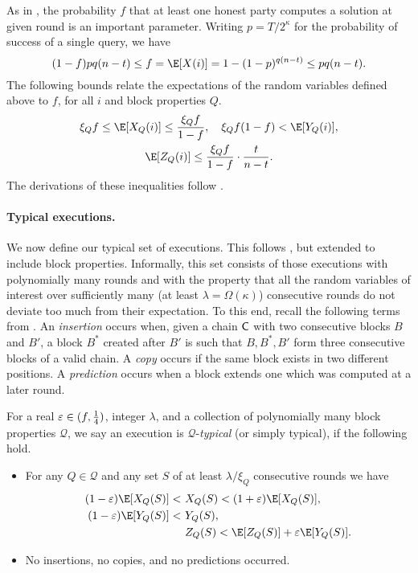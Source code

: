 As in \cite{EC:GarKiaLeo15}, the probability $f$ that at least one honest party
computes a solution at given round is an important parameter.
Writing $p=T/2^\kappa$ for the probability of success of a single query, we
have
\[
	(1-f){pq(n-t)}\le f=\E[X(i)]=1-(1-p)^{q(n-t)}\le pq(n-t)
.\]
The following bounds relate the expectations of the random variables defined
above to $f$, for all $i$ and block properties $Q$.
\begin{gather*}
	\xi_Q f\le\E[X_Q(i)]\le\frac{\xi_Q f}{1-f},\quad
		\xi_Q f(1-f)<\E[Y_Q(i)],\\
	\E[Z_Q(i)]\le\frac{\xi_Q f}{1-f}\cdot\frac t{n-t}
.\end{gather*}
The derivations of these inequalities follow \cite{GKL15NEW}.

\paragraph{Typical executions.} %
We now define our typical set of executions. This follows \cite{GKL15NEW}, but
extended to include block properties.
Informally, this set consists of
those executions with polynomially many rounds and with the property that all
the random variables of interest over sufficiently many (at least
$\lambda=\Omega(\kappa)$) consecutive rounds do not deviate too much from
their expectation.
To this end, recall the following terms from \cite{GKL15NEW}. An
\emph{insertion} occurs when, given a chain $\mathsf{C}$ with two consecutive
blocks $B$ and $B'$, a block $B^*$ created after $B'$ is such that $B,B^*,B'$
form three consecutive blocks of a valid chain. A \emph{copy} occurs if the
same block exists in two different positions. A \emph{prediction} occurs when
a block extends one which was computed at a later round.

\begin{definition}\label{def:typical}
	For a real $\varepsilon\in(f,\frac14)$, integer $\lambda$, and
	a collection of polynomially many block properties $\mathcal{Q}$, we say an
	execution is $\mathcal{Q}$-\emph{typical} (or simply typical), if the following
	hold.
	\begin{itemize}
		\item
			For any $Q\in\mathcal{Q}$ and any set $S$ of at least $\lambda/\xi_Q$
			consecutive rounds we have
			\begin{align}
				(1-\eps)\E[X_Q(S)]<~&X_Q(S)<(1+\eps)\E[X_Q(S)],
				\\(1-\eps)\E[Y_Q(S)]<~&Y_Q(S),
				\\&Z_Q(S)<\E[Z_Q(S)]+\eps\E[Y_Q(S)].
			\end{align}
		\item
			No insertions, no copies, and no predictions occurred.
	\end{itemize}
\end{definition}%

